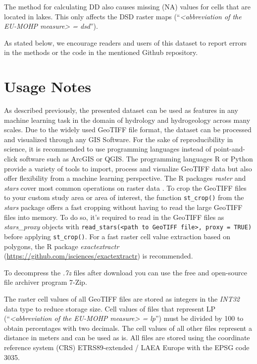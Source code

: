 \documentclass[fleqn,10pt]{wlscirep}
\begin{document}
The method for calculating DD also causes missing (NA) values for cells that are located in lakes. This only affects the DSD raster maps (``\emph{\textless abbreviation of the EU-MOHP measure\textgreater{} = dsd}'').

As stated below, we encourage readers and users of this dataset to report errors in the methods or the code in the mentioned Github repository.

\hypertarget{usage-notes}{%
\section*{Usage Notes}\label{usage-notes}}

As described previously, the presented dataset can be used as features in any machine learning task in the domain of hydrology and hydrogeology across many scales. Due to the widely used GeoTIFF file format, the dataset can be processed and visualized through any GIS Software. For the sake of reproducibility in science, it is recommended to use programming languages instead of point-and-click software such as ArcGIS or QGIS. The programming languages R or Python provide a variety of tools to import, process and visualize GeoTIFF data but also offer flexibility from a machine learning perspective. The R packages \emph{raster} and \emph{stars} cover most common operations on raster data \cite{hijmans_raster_2020, pebesma_stars_2021}. To crop the GeoTIFF files to your custom study area or area of interest, the function \texttt{st\_crop()} from the \emph{stars} package offers a fast cropping without having to read the large GeoTIFF files into memory. To do so, it's required to read in the GeoTIFF files as \emph{stars\_proxy} objects with \texttt{read\_stars(\textless{}path\ to\ GeoTIFF\ file\textgreater{},\ proxy\ =\ TRUE)} before applying \texttt{st\_crop()}. For a fast raster cell value extraction based on polygons, the R package \emph{exactextractr} (\url{https://github.com/isciences/exactextractr}) is recommended.

To decompress the \emph{.7z} files after download you can use the free and open-source file archiver program 7-Zip.

The raster cell values of all GeoTIFF files are stored as integers in the \emph{INT32} data type to reduce storage size. Cell values of files that represent LP (``\emph{\textless abbreviation of the EU-MOHP measure\textgreater{} = lp}'') must be divided by 100 to obtain percentages with two decimals. The cell values of all other files represent a distance in meters and can be used as is. All files are stored using the coordinate reference system (CRS) ETRS89-extended / LAEA Europe with the EPSG code 3035.
\end{document}

